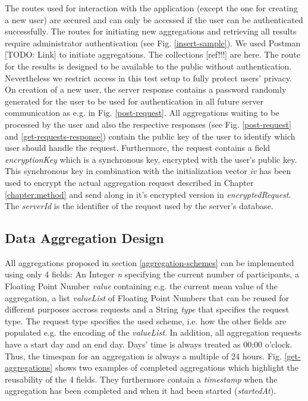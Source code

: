 The routes used for interaction with the application (except the one for creating a new user) are secured and can only be accessed if the user can be authenticated successfully. The routes for initiating new aggregations and retrieving all results require administrator authentication (see Fig. \ref{insert-sample}). We used Postman [TODO: Link] to initiate aggregations. The collections [ref!!!] are here. The route for the results is designed to be available to the public without authentication. Nevertheless we restrict access in this test setup to fully protect users' privacy.\\
On creation of a new user, the server response contains a password randomly generated for the user to be used for authentication in all future server communication as e.g. in Fig. \ref{post-request}. All aggregations waiting to be processed by the user and also the respective responses (see Fig. \ref{post-request} and \ref{get-requests-response}) contain the public key of the user to identify which user should handle the request. Furthermore, the request contains a field \textit{encryptionKey} which is a synchronous key, encrypted with the user's public key. This synchronous key in combination with the initialization vector \textit{iv} has been used to encrypt the actual aggregation request described in Chapter \ref{chapter:method} and send along in it's encrypted version in \textit{encryptedRequest}. The \textit{serverId} is the identifier of the request used by the server's database.


\subsection{Data Aggregation Design}\label{data-aggregation-design}
All aggregations proposed in section \ref{aggregation-schemes} can be implemented using only 4 fields: An Integer \textit{n} specifying the current number of participants, a Floating Point Number \textit{value} containing e.g. the current mean value of the aggregation, a list \textit{valueList} of Floating Point Numbers that can be reused for different purposes accross requests and a String \textit{type} that specifies the request type. The request type specifies the used scheme, i.e. how the other fields are populated e.g. the encoding of the \textit{valueList}. In addition, all aggregation requests have a start day and an end day. Days' time is always treated as 00:00 o'clock. Thus, the timespan for an aggregation is always a multiple of 24 hours. Fig. \ref{get-aggregations} shows two examples of completed aggregations which highlight the reusability of the 4 fields. They furthermore contain a \textit{timestamp} when the aggregation has been completed and when it had been started (\textit{startedAt}).\\

